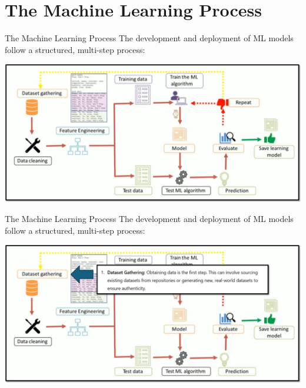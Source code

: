 \documentclass[11pt]{beamer}
\begin{document}
\section{The Machine Learning Process
\\ }
\begin{frame}{The Machine Learning Process}
The development and deployment of ML models follow a structured, multi-step process:

	\begin{center}
	\includegraphics[scale=0.4]{../05-pictures/lesson-1-1_pic_11.png}
	\end{center}
\end{frame}
\begin{frame}{The Machine Learning Process}
The development and deployment of ML models follow a structured, multi-step process:

	\begin{center}
	\includegraphics[scale=0.4]{../05-pictures/lesson-1-1_pic_12.png}
	\end{center}
\end{frame}
\end{document}
